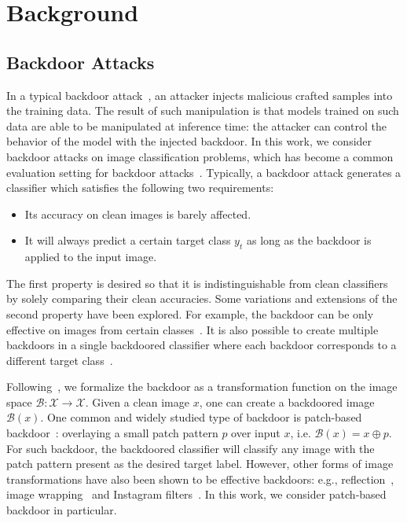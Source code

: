 \documentclass[10pt,twocolumn,letterpaper]{article}
\begin{document}
\section{Background}\subsection{Backdoor Attacks}\label{backdoor_background}
In a typical backdoor attack~\cite{poison_svm,badnet,bagdasaryan2020blind}, an attacker injects malicious crafted samples into the training data. The result of such manipulation is that models trained on such data are able to be manipulated at inference time: the attacker can control the behavior of the model with the injected backdoor. In this work, we consider backdoor attacks on image classification problems, which has become a common evaluation setting for backdoor attacks~\cite{badnet,turner2019cleanlabel,bagdasaryan2020blind}. Typically, a backdoor attack generates a classifier which satisfies the following two requirements:
\begin{itemize}[topsep=1pt]
\setlength\itemsep{-.4em}
    \item Its accuracy on clean images is barely affected.
    \item It will always predict a certain target class $y_{t}$ as long as the backdoor is applied to the input image.
\end{itemize}
The first property is desired so that it is indistinguishable from clean classifiers by solely comparing their clean accuracies. Some variations and extensions of the second property have been explored. For example, the backdoor can be only effective on images from certain classes~\cite{darpa2021trojai}. It is also possible to create multiple backdoors in a single backdoored classifier where each backdoor corresponds to a different target class~\cite{bagdasaryan2020blind}.

Following~\cite{wanet2021nguyen}, we formalize the backdoor as a transformation function on the image space $\mathcal{B}: \mathcal{X}\to \mathcal{X}$. Given a clean image $x$, one can create a backdoored image $\mathcal{B}(x)$. One common and widely studied type of backdoor is patch-based backdoor~\cite{badnet}: overlaying a small patch pattern $p$ over input $x$, i.e. $\mathcal{B}(x)=x\oplus p$. For such backdoor, the backdoored classifier will classify any image  with the patch pattern present as the desired target label. However, other forms of image transformations have also been shown to be effective backdoors: e.g., reflection~\cite{reflection2020liu}, image wrapping~\cite{wanet2021nguyen} and Instagram filters~\cite{trojai_data}. In this work, we consider patch-based backdoor in particular.
\end{document}
